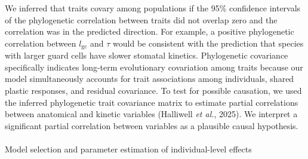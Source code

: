 \documentclass[
  letterpaper,
  DIV=11,
  numbers=noendperiod]{scrartcl}
\makeatletter
\let\oldparagraph\paragraph
\renewcommand{\paragraph}{
    \@ifstar
      \xxxParagraphStar
      \xxxParagraphNoStar
  }
\newcommand{\xxxParagraphStar}[1]{\oldparagraph*{#1}\mbox{}}
\newcommand{\xxxParagraphNoStar}[1]{\oldparagraph{#1}\mbox{}}
\newcommand{\gcl}{$l_\mathrm{gc}$}
\makeatother
\begin{document}
We inferred that traits covary among populations if the 95\% confidence
intervals of the phylogenetic correlation between traits did not overlap
zero and the correlation was in the predicted direction. For example, a
positive phylogenetic correlation between \gcl{} and \(\tau\) would be
consistent with the prediction that species with larger guard cells have
slower stomatal kinetics. Phylogenetic covariance specifically indicates
long-term evolutionary covariation among traits because our model
simultaneously accounts for trait associations among individuals, shared
plastic responses, and residual covariance. To test for possible
causation, we used the inferred phylogenetic trait covariance matrix to
estimate partial correlations between anatomical and kinetic variables
(Halliwell \emph{et al.}, 2025). We interpret a significant partial
correlation between variables as a plausible causal hypothesis.

\paragraph{Model selection and parameter estimation of individual-level
effects}\label{model-selection-and-parameter-estimation-of-individual-level-effects}
\end{document}
